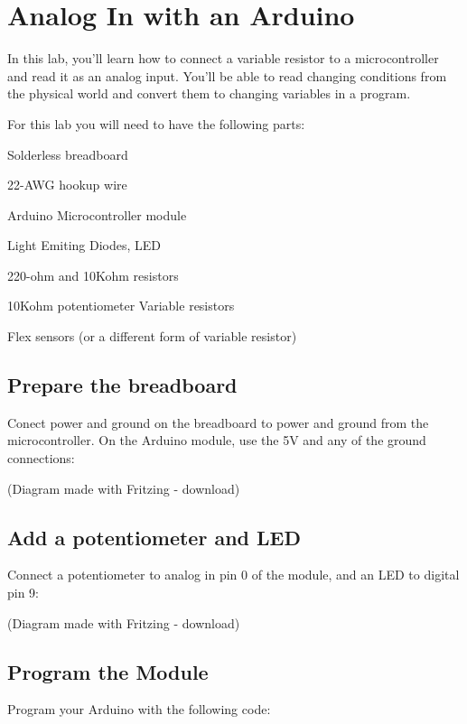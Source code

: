 \chapter{Analog In with an Arduino}

In this lab, you'll learn how to connect a variable resistor to a microcontroller and read it as an analog input. You'll be able to read changing conditions from the physical world and convert them to changing variables in a program.

For this lab you will need to have the following parts:

Solderless breadboard

22-AWG hookup wire

Arduino Microcontroller 
module


Light Emiting Diodes, LED

220-ohm and 10Kohm resistors

10Kohm potentiometer
Variable resistors

Flex sensors
(or a different
form of variable resistor)

\section{Prepare the breadboard}

Conect power and ground on the breadboard to power and ground from the microcontroller. On the Arduino module, use the 5V and any of the ground connections:

(Diagram made with Fritzing - download) 

\section{Add a potentiometer and LED}

Connect a potentiometer to analog in pin 0 of the module, and an LED to digital pin 9:

(Diagram made with Fritzing - download)

\section{Program the Module}

Program your Arduino with the following code:

